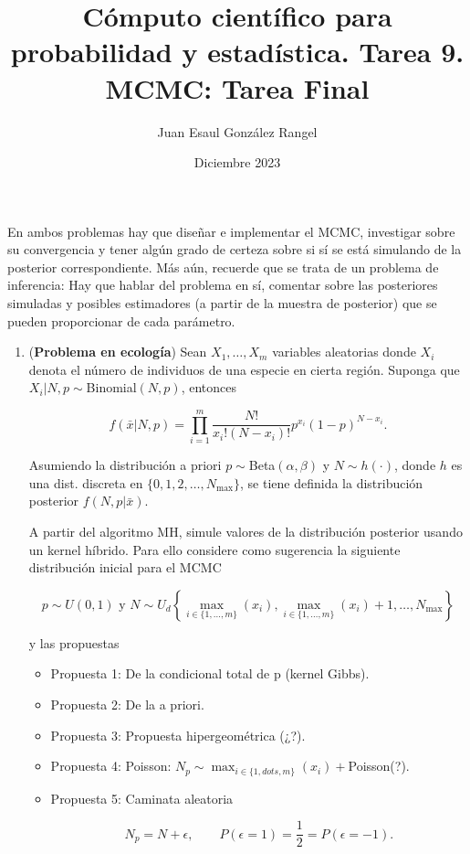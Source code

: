 \documentclass{article}
\title{Cómputo científico para probabilidad y estadística. Tarea 9.\\
MCMC: Tarea Final}
\author{Juan Esaul González Rangel}
\date{Diciembre 2023}
\begin{document}
\maketitle

En ambos problemas hay que diseñar e implementar el MCMC, investigar sobre su 
convergencia y tener algún grado de certeza sobre si sí se está simulando de la 
posterior correspondiente. Más aún, recuerde que se trata de un problema de 
inferencia: Hay que hablar del problema en sí, comentar sobre las posteriores 
simuladas y posibles estimadores (a partir de la muestra de posterior) que se 
pueden proporcionar de cada parámetro.

\begin{enumerate}
    \item (\textbf{Problema en ecología}) Sean $X_1, \dots, X_m$ variables aleatorias donde $X_i$ denota el número de individuos de una especie en cierta región. Suponga que $X_i|N, p \sim $Binomial$(N, p)$, entonces
    
    \[f (\bar x|N, p) = \prod_{i=1}^m \frac{N!}{x_i!(N - x_i)!}p^{x_i} (1 - p)^{N - x_i}.\]

    Asumiendo la distribución a priori $p \sim $Beta$(\alpha, \beta)$ y $N \sim h(\cdot)$, donde $h$ es una dist. discreta en $\{0, 1, 2, \dots , N_{\max} \}$, se tiene definida la distribución posterior $f (N, p |\bar x)$.
    
    A partir del algoritmo MH, simule valores de la distribución posterior usando un kernel híbrido. Para ello considere como sugerencia la siguiente distribución inicial para el MCMC 
    
    \[p \sim U(0, 1) \text{ y } N \sim U_d \left\{\max_{i\in\{1,\dots,m\}}(x_i), \max_{i\in\{1,\dots,m\}}(x_i) + 1, \dots , N_{\max}\right\}\]
    
    y las propuestas

    \begin{itemize}
        \item Propuesta 1: De la condicional total de p (kernel Gibbs).
        \item Propuesta 2: De la a priori.
        \item Propuesta 3: Propuesta hipergeométrica (¿?).
        \item Propuesta 4: Poisson: $N_p \sim \max_{i\in\{1,dots,m\}}(x_i) + $Poisson(?).
        \item Propuesta 5: Caminata aleatoria
    
    \[N_p = N + \epsilon, \qquad P(\epsilon = 1) = \frac12 = P(\epsilon = -1).\]
    

\end{itemize}
\end{enumerate}
\end{document}
